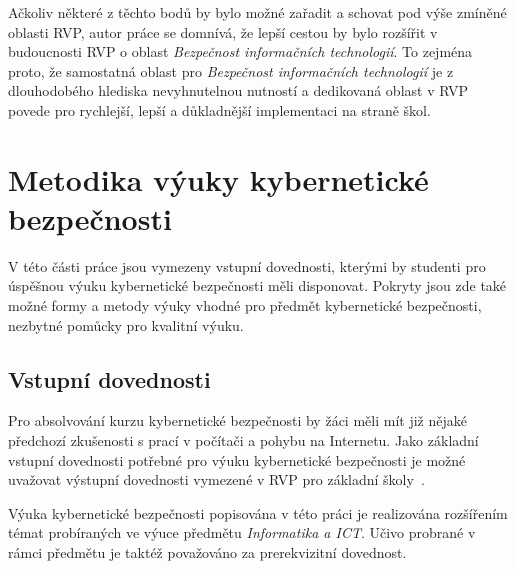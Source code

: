 \documentclass[a4paper, 12pt]{article}
\begin{document}
Ačkoliv některé z těchto bodů by bylo možné zařadit a schovat pod výše zmíněné oblasti RVP, autor práce se domnívá, že lepší cestou by bylo rozšířit v budoucnosti RVP o oblast \textit{Bezpečnost informačních technologií}. To zejména proto, že samostatná oblast pro \textit{Bezpečnost informačních technologií} je z dlouhodobého hlediska nevyhnutelnou nutností a dedikovaná oblast v RVP povede pro rychlejší, lepší a důkladnější implementaci na straně škol.


\newpage
\section{Metodika výuky kybernetické bezpečnosti}
V této části práce jsou vymezeny vstupní dovednosti, kterými by studenti pro úspěšnou výuku kybernetické bezpečnosti měli disponovat. Pokryty jsou zde také možné formy a metody výuky vhodné pro předmět kybernetické bezpečnosti, nezbytné pomůcky pro kvalitní výuku.


\subsection{Vstupní dovednosti}
Pro absolvování kurzu kybernetické bezpečnosti by žáci měli mít již nějaké předchozí zkušenosti s prací v počítači a pohybu na Internetu. Jako základní vstupní dovednosti potřebné pro výuku kybernetické bezpečnosti je možné uvažovat výstupní dovednosti vymezené v RVP pro základní školy~\cite{rvpElementary}. 

Výuka kybernetické bezpečnosti popisována v této práci je realizována rozšířením témat probíraných ve výuce předmětu \textit{Informatika a ICT}. Učivo probrané v rámci předmětu je taktéž považováno za prerekvizitní dovednost.
\end{document}
